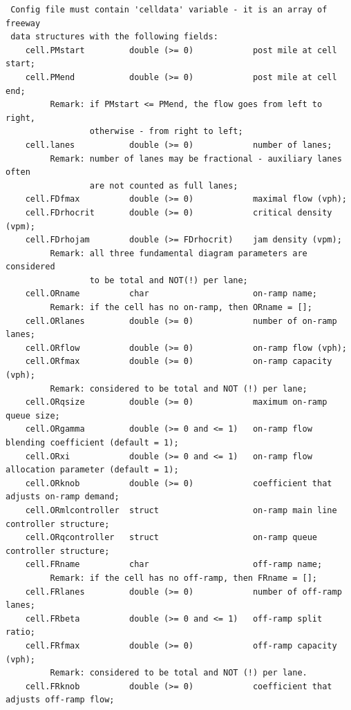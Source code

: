 \documentclass[UTF8,12.05pt]{ctexart}
\begin{document}
\begin{lstlisting}
 Config file must contain 'celldata' variable - it is an array of freeway
 data structures with the following fields:
    cell.PMstart         double (>= 0)            post mile at cell start;
    cell.PMend           double (>= 0)            post mile at cell end;
         Remark: if PMstart <= PMend, the flow goes from left to right,
                 otherwise - from right to left;
    cell.lanes           double (>= 0)            number of lanes;
         Remark: number of lanes may be fractional - auxiliary lanes often
                 are not counted as full lanes;
    cell.FDfmax          double (>= 0)            maximal flow (vph);
    cell.FDrhocrit       double (>= 0)            critical density (vpm);
    cell.FDrhojam        double (>= FDrhocrit)    jam density (vpm);
         Remark: all three fundamental diagram parameters are considered
                 to be total and NOT(!) per lane;
    cell.ORname          char                     on-ramp name;
         Remark: if the cell has no on-ramp, then ORname = [];
    cell.ORlanes         double (>= 0)            number of on-ramp lanes;
    cell.ORflow          double (>= 0)            on-ramp flow (vph);
    cell.ORfmax          double (>= 0)            on-ramp capacity (vph);
         Remark: considered to be total and NOT (!) per lane;
    cell.ORqsize         double (>= 0)            maximum on-ramp queue size;
    cell.ORgamma         double (>= 0 and <= 1)   on-ramp flow blending coefficient (default = 1);
    cell.ORxi            double (>= 0 and <= 1)   on-ramp flow allocation parameter (default = 1);
    cell.ORknob          double (>= 0)            coefficient that adjusts on-ramp demand;
    cell.ORmlcontroller  struct                   on-ramp main line controller structure;
    cell.ORqcontroller   struct                   on-ramp queue controller structure;
    cell.FRname          char                     off-ramp name;
         Remark: if the cell has no off-ramp, then FRname = [];
    cell.FRlanes         double (>= 0)            number of off-ramp lanes;
    cell.FRbeta          double (>= 0 and <= 1)   off-ramp split ratio;
    cell.FRfmax          double (>= 0)            off-ramp capacity (vph);
         Remark: considered to be total and NOT (!) per lane.
    cell.FRknob          double (>= 0)            coefficient that adjusts off-ramp flow;


\end{lstlisting}
\end{document}
